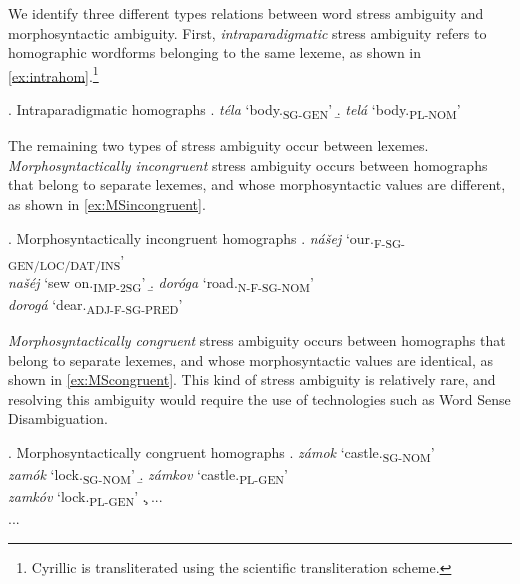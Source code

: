 \documentclass[11pt]{article}
\newcommand{\rus}[1]{\foreignlanguage{russian}{#1}}
\begin{document}
We identify three different types relations between word stress ambiguity and
morphosyntactic ambiguity. First, \emph{intraparadigmatic} stress ambiguity 
refers to homographic wordforms belonging to the same lexeme, as shown in 
\ref{ex:intrahom}.\footnote{Cyrillic is transliterated using the scientific transliteration
scheme.}

\ex. Intraparadigmatic homographs \label{ex:intrahom}
\a. \emph{t\'{e}la} `body.\textsubscript{SG-GEN}' 
    \label{ex:bodySGGEN}
\b. \emph{tel\'{a}} `body.\textsubscript{PL-NOM}' 
    \label{ex:bodyPLNOM}

The remaining two types of stress ambiguity occur between lexemes. 
\emph{Morphosyntactically incongruent} stress ambiguity occurs between homographs
that belong to separate lexemes, and whose morphosyntactic values are different, 
as shown in \ref{ex:MSincongruent}.

\ex. Morphosyntactically incongruent homographs \label{ex:MSincongruent}
\a. \emph{nášej} `our.\textsubscript{F-SG-GEN/LOC/DAT/INS}'\\
    \emph{našéj} `sew on.\textsubscript{IMP-2SG}'
\b. \emph{doróga} `road.\textsubscript{N-F-SG-NOM}'\\
    \emph{dorogá} `dear.\textsubscript{ADJ-F-SG-PRED}'

\emph{Morphosyntactically congruent} stress ambiguity occurs between homographs 
that belong to separate lexemes, 
and whose morphosyntactic values are identical, as shown in
\ref{ex:MScongruent}. This kind of stress ambiguity is relatively rare, 
and resolving this ambiguity would require the use of technologies such as Word Sense Disambiguation.

\ex. Morphosyntactically congruent homographs \label{ex:MScongruent}
\a. \emph{z\'{a}mok} `castle.\textsubscript{SG-NOM}'\\
	\emph{zam\'{o}k} `lock.\textsubscript{SG-NOM}'
\b. \emph{z\'{a}mkov} `castle.\textsubscript{PL-GEN}'\\
	\emph{zamk\'{o}v} `lock.\textsubscript{PL-GEN}'
\c. ...\\
	...
\end{document}
